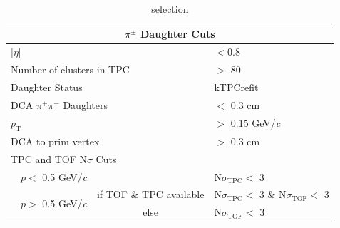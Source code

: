 \documentclass[/home/jesse/Analysis/FemtoAnalysis/AnalysisNotes/AnalysisNoteJBuxton.tex]{subfiles}
\begin{document}
\begin{table}[htbp]
\begin{tabular}{lc|c|l}
   
   \multicolumn{4}{c}{\textbf{$\pi^{\pm}$ Daughter Cuts}} \\
   \hline
   \multicolumn{3}{l|}{$|\eta|$} &  $< 0.8$ \\
   \hline
   \multicolumn{3}{l|}{Number of clusters in TPC} & $>$ 80 \\
   \hline
   \multicolumn{3}{l|}{Daughter Status} & kTPCrefit \\
   \hline
   \multicolumn{3}{l|}{DCA $\pi^{+}\pi^{-}$ Daughters} & $<$ 0.3 cm \\
   \hline
   \multicolumn{3}{l|}{$p_{\mathrm{T}}$} & $>$ 0.15 GeV/\textit{c} \\
   \hline
   \multicolumn{3}{l|}{DCA to prim vertex} & $>$ 0.3 cm \\
   \hline
   \multicolumn{4}{l}{TPC and TOF N$\sigma$ Cuts} \\
   \hline
    & \multicolumn{1}{c}{$p <$ 0.5 GeV/\textit{c}} &  & N$\sigma_{\mathrm{TPC}} <$ 3 \\
   \hline
    & \multirow{2}{*}{$p >$ 0.5 GeV/\textit{c}} &  if TOF \& TPC available & N$\sigma_{\mathrm{TPC}} <$ 3 \& N$\sigma_{\mathrm{TOF}} <$ 3 \\
   \cline{3-4}
    & & else & N$\sigma_{\mathrm{TOF}} <$ 3 \\
   \hline   
  \end{tabular}
 \caption{\Ks selection}
 \label{tab:K0sCuts} 
\end{table}
\end{document}
